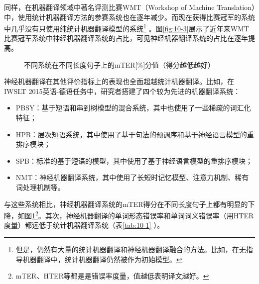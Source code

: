 \parinterval  同样，在机器翻译领域中著名评测比赛WMT（Workshop of Machine Translation）中，使用统计机器翻译方法的参赛系统也在逐年减少。而现在获得比赛冠军的系统中几乎没有只使用纯统计机器翻译模型的系统\footnote{但是，仍然有大量的统计机器翻译和神经机器翻译融合的方法。比如，在无指导机器翻译中，统计机器翻译仍然被作为初始模型。} 。图\ref{fig:10-3}展示了近年来WMT比赛冠军系统中神经机器翻译系统的占比，可见神经机器翻译系统的占比在逐年提高。

\begin{figure}[htp]
\centering

\caption{不同系统在不同长度句子上的mTER[\%]分值（得分越低越好）}
\label{fig:10-4}
\end{figure}

\parinterval  神经机器翻译在其他评价指标上的表现也全面超越统计机器翻译。比如，在IWSLT 2015英语-德语任务中，研究者搭建了四个较为先进的机器翻译系统：

\begin{itemize}
\vspace{0.3em}
\item PBSY：基于短语和串到树模型的混合系统，其中也使用了一些稀疏的词汇化特征；
\vspace{0.3em}
\item HPB：层次短语系统，其中使用了基于句法的预调序和基于神经语言模型的重排序模块；
\vspace{0.3em}
\item SPB：标准的基于短语的模型，其中使用了基于神经语言模型的重排序模块；
\vspace{0.3em}
\item NMT：神经机器翻译系统，其中使用了长短时记忆模型、注意力机制、稀有词处理机制等。
\end{itemize}

\parinterval  与这些系统相比，神经机器翻译系统的mTER得分在不同长度句子上都有明显的下降，如图\ref{fig:10-4}\footnote{mTER、HTER等都是是错误率度量，值越低表明译文越好。}。其次，神经机器翻译的单词形态错误率和单词词义错误率（用HTER度量）都远低于统计机器翻译系统（表\ref{tab:10-1} ）。

